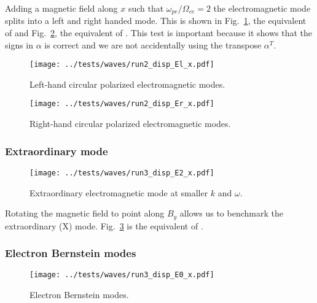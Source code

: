 \documentclass[%
preprint,
amsmath,amssymb,
aps,
]{revtex4-2}
\begin{document}
Adding a magnetic field along $x$ such that $\omega_{pe}/\Omega_{ce} = 2$ the
electromagnetic mode splits into a left and right handed mode. This is shown in
Fig.~\ref{fig:waves_Bx_E1}, the equivalent of \cite[Figure 5]{kilian_2017} and
Fig.~\ref{fig:waves_Bx_Er}, the equivalent of \cite[Figure 6]{kilian_2017}.
This test is important because it shows that the signs in $\alpha$ is correct
and we are not accidentally using the transpose $\alpha^{T}$.

\begin{figure}
    \centering
    \texttt{[image: ../tests/waves/run2\_disp\_El\_x.pdf]}
    \caption{Left-hand circular polarized electromagnetic modes.}
    \label{fig:waves_Bx_E1}
\end{figure}

\begin{figure}
    \centering
    \texttt{[image: ../tests/waves/run2\_disp\_Er\_x.pdf]}
    \caption{Right-hand circular polarized electromagnetic modes.}
    \label{fig:waves_Bx_Er}
\end{figure}

\FloatBarrier

\subsubsection{Extraordinary mode}

\begin{figure}
    \centering
    \texttt{[image: ../tests/waves/run3\_disp\_E2\_x.pdf]}
    \caption{Extraordinary electromagnetic mode at smaller $k$ and $\omega$.}
    \label{fig:waves_By_E1}
\end{figure}

Rotating the magnetic field to point along $B_y$ allows us to benchmark the
extraordinary (X) mode. Fig.~\ref{fig:waves_By_E1} is the equivalent of
\cite[Figure 7]{kilian_2017}.

\FloatBarrier

\subsubsection{Electron Bernstein modes}

\begin{figure}
    \centering
    \texttt{[image: ../tests/waves/run3\_disp\_E0\_x.pdf]}
    \caption{Electron Bernstein modes.}
    \label{fig:waves_By_E0}
\end{figure}
\end{document}
